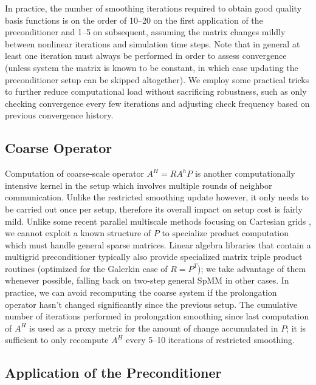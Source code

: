 In practice, the number of smoothing iterations required to obtain good quality basis functions is on the order of 10--20 on the first application of the preconditioner and 1--5 on subsequent, assuming the matrix changes mildly between nonlinear iterations and simulation time steps.   Note that in general at least one iteration must always be performed in order to assess convergence (unless system the matrix is known to be constant, in which case updating the preconditioner setup can be skipped altogether).   We employ some practical tricks to further reduce computational load without sacrificing robustness, such as only checking convergence every few iterations and adjusting check frequency based on previous convergence history.

\subsection{Coarse Operator}
\label{subsec:par_kernels_coarse}

Computation of coarse-scale operator $A^H = RA^hP$ is another computationally intensive kernel in the setup which involves multiple rounds of neighbor communication.   Unlike the restricted smoothing update however, it only needs to be carried out once per setup, therefore its overall impact on setup cost is fairly mild.   Unlike some recent parallel multiscale methods focusing on Cartesian grids \cite{Manea2016,Manea2019,Manea2021}, we cannot exploit a known structure of $P$ to specialize product computation which must handle general sparse matrices.   Linear algebra libraries that contain a multigrid preconditioner typically also provide specialized matrix triple product routines (optimized for the Galerkin case of $R = P^T$); we take advantage of them whenever possible, falling back on two-step general SpMM in other cases.   In practice, we can avoid recomputing the coarse system if the prolongation operator hasn't changed significantly since the previous setup.   The cumulative number of iterations performed in prolongation smoothing since last computation of $A^H$ is used as a proxy metric for the amount of change accumulated in $P$; it is sufficient to only recompute $A^H$ every 5--10 iterations of restricted smoothing.

\subsection{Application of the Preconditioner}
\label{subsec:par_kernels_apply}

